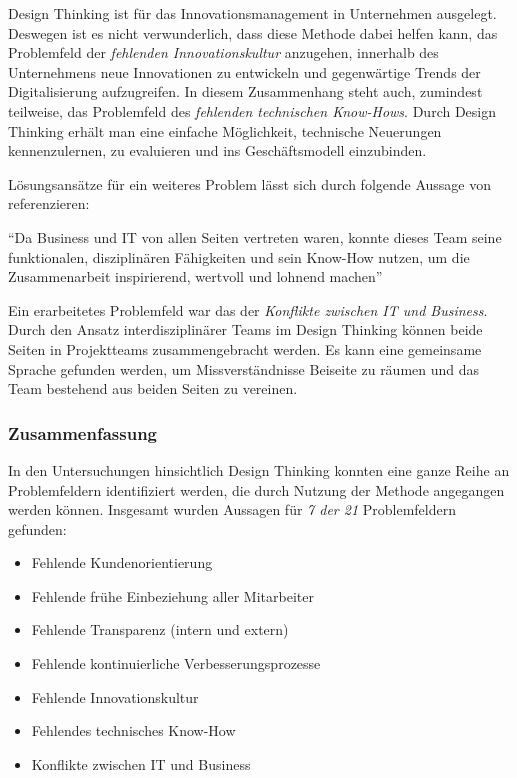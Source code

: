 Design Thinking ist für das Innovationsmanagement in Unternehmen ausgelegt. Deswegen ist es nicht verwunderlich, dass diese Methode dabei helfen kann, das Problemfeld der \textit{fehlenden Innovationskultur} anzugehen, innerhalb des Unternehmens neue Innovationen zu entwickeln und gegenwärtige Trends der Digitalisierung aufzugreifen. In diesem Zusammenhang steht auch, zumindest teilweise, das Problemfeld des \textit{fehlenden technischen Know-Hows}. Durch Design Thinking erhält man eine einfache Möglichkeit, technische Neuerungen kennenzulernen, zu evaluieren und ins Geschäftsmodell einzubinden.

Lösungsansätze für ein weiteres Problem lässt sich durch folgende Aussage von  referenzieren:

\begin{center}
	``Da Business und IT von allen Seiten vertreten waren, konnte dieses Team seine funktionalen, disziplinären Fähigkeiten und sein Know-How nutzen, um die Zusammenarbeit inspirierend, wertvoll und lohnend machen'' \cite[S. 215]{oswald_shaping_2017}
\end{center}

Ein erarbeitetes Problemfeld war das der \textit{Konflikte zwischen IT und Business}. Durch den Ansatz interdisziplinärer Teams im Design Thinking können beide Seiten in Projektteams zusammengebracht werden. Es kann eine gemeinsame Sprache gefunden werden, um Missverständnisse Beiseite 
zu räumen und das Team bestehend aus beiden Seiten zu vereinen.

\todots

\subsubsection{Zusammenfassung}

In den Untersuchungen hinsichtlich Design Thinking konnten eine ganze Reihe an Problemfeldern identifiziert werden, die durch Nutzung der Methode angegangen werden können. Insgesamt wurden Aussagen für \textit{7 der 21} Problemfeldern gefunden:

\begin{itemize}[noitemsep, topsep=0pt]
	\item Fehlende Kundenorientierung
	\item Fehlende frühe Einbeziehung aller Mitarbeiter
	\item Fehlende Transparenz (intern und extern)
	\item Fehlende kontinuierliche Verbesserungsprozesse
	\item Fehlende Innovationskultur
	\item Fehlendes technisches Know-How
	\item Konflikte zwischen IT  und Business
\end{itemize}

